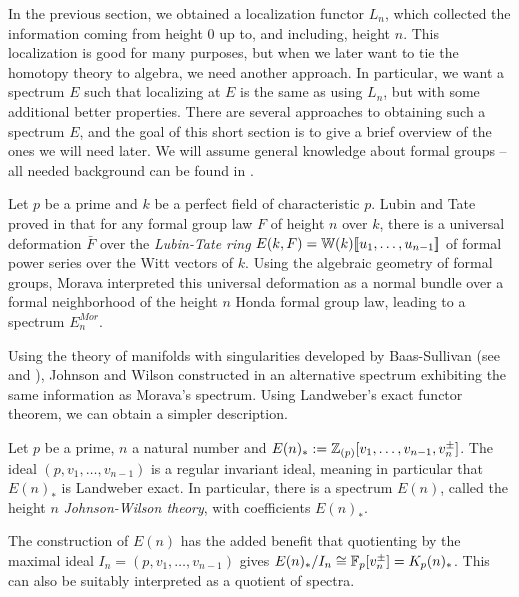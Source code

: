 In the previous section, we obtained a localization functor $L_n$, which collected the information coming from height $0$ up to, and including, height $n$. This localization is good for many purposes, but when we later want to tie the homotopy theory to algebra, we need another approach. In particular, we want a spectrum $E$ such that localizing at $E$ is the same as using $L_n$, but with some additional better properties. There are several approaches to obtaining such a spectrum $E$, and the goal of this short section is to give a brief overview of the ones we will need later. We will assume general knowledge about formal groups -- all needed background can be found in \cite[Appendix 2]{ravenel_86}. 

\begin{remark}
    Let $p$ be a prime and $k$ be a perfect field of characteristic $p$. Lubin and Tate proved in \cite{lubin-tate_66} that for any formal group law $F$ of height $n$ over $k$, there is a universal deformation $\bar{F}$ over the \emph{Lubin-Tate ring} $E(k, F)=\mathbb{W}(k)[\![ u_1, \ldots, u_{n-1}]\!]$ of formal power series over the Witt vectors of $k$. Using the algebraic geometry of formal groups, Morava interpreted this universal deformation as a normal bundle over a formal neighborhood of the height $n$ Honda formal group law, leading to a spectrum $E^{Mor}_n$. 
\end{remark} 

Using the theory of manifolds with singularities developed by Baas-Sullivan (see \cite{baas_73a} and \cite{baas_73b}), Johnson and Wilson constructed in \cite{johnson-wilson_75} an alternative spectrum exhibiting the same information as Morava's spectrum. Using Landweber's exact functor theorem, we can obtain a simpler description. 

\begin{definition}
    Let $p$ be a prime, $n$ a natural number and $E(n)_* := \mathbb{Z}_{(p)}[v_1, \ldots, v_{n-1}, v_n^{\pm}]$. The ideal $(p, v_1, \ldots, v_{n-1})$ is a regular invariant ideal, meaning in particular that $E(n)_*$ is Landweber exact. In particular, there is a spectrum $E(n)$, called the height $n$ \emph{Johnson-Wilson theory}, with coefficients $E(n)_*$. 
\end{definition}

\begin{remark}
    \label{ch0:rm:K-as-quotient-of-E}
    The construction of $E(n)$ has the added benefit that quotienting by the maximal ideal $I_n = (p, v_1, \ldots, v_{n-1})$ gives $E(n)_*/I_n \cong \mathbb{F}_p[v_n^{\pm}] = K_p(n)_*$. This can also be suitably interpreted as a quotient of spectra. 
\end{remark}


